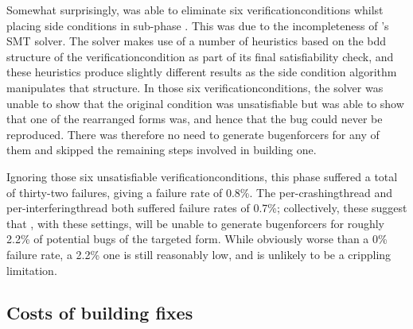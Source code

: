 Somewhat surprisingly, {\implementation} was able to eliminate six
\glspl{verificationcondition} whilst placing \glspl{side condition} in
sub-phase .  This was due to the incompleteness of
{\implementation}'s SMT solver.  The solver makes use of a number of
heuristics based on the \gls{bdd} structure of the
\gls{verificationcondition} as part of its final satisfiability check,
and these heuristics produce slightly different results as the
\gls{side condition} algorithm manipulates that structure.  In those
six \glspl{verificationcondition}, the solver was unable to show that
the original condition was unsatisfiable but was able to show that one
of the rearranged forms was, and hence that the bug could never be
reproduced.  There was therefore no need to generate
\glspl{bugenforcer} for any of them and {\implementation} skipped the
remaining steps involved in building one.

Ignoring those six unsatisfiable \glspl{verificationcondition}, this
phase suffered a total of thirty-two failures, giving a failure rate
of 0.8\%.  The per-\gls{crashingthread} and
per-\gls{interferingthread} both suffered failure rates of 0.7\%;
collectively, these suggest that {\implementation}, with these settings,
will be unable to generate \glspl{bugenforcer} for roughly 2.2\% of
potential bugs of the targeted form.  While obviously worse than a 0\%
failure rate, a 2.2\% one is still reasonably low, and is unlikely to
be a crippling limitation.

\subsection{Costs of building fixes}


